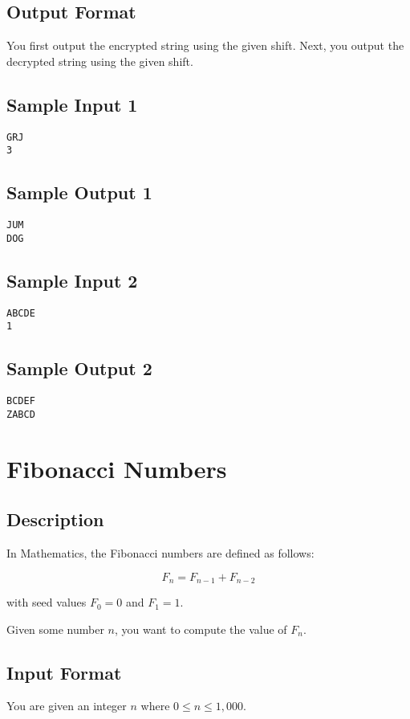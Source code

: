 \subsection*{Output Format}
You first output the encrypted string using the given shift.
Next, you output the decrypted string using the given shift. 

\subsection*{Sample Input 1}
\begin{verbatim}
GRJ
3
\end{verbatim}
\subsection*{Sample Output 1}
\begin{verbatim}
JUM
DOG
\end{verbatim}

\subsection*{Sample Input 2}
\begin{verbatim}
ABCDE
1
\end{verbatim}
\subsection*{Sample Output 2}
\begin{verbatim}
BCDEF
ZABCD
\end{verbatim}


\newpage

\section{Fibonacci Numbers}
\subsection*{Description}
In Mathematics, the Fibonacci numbers are defined as follows:

\begin{equation*}
F_n = F_{n-1} + F_{n-2}
\end{equation*}

with seed values $F_0 = 0$ and $F_1 = 1$. 

Given some number $n$, you want to compute the value of $F_n$. 

\subsection*{Input Format}
You are given an integer $n$ where $0 \leq n \leq 1,000$. 

